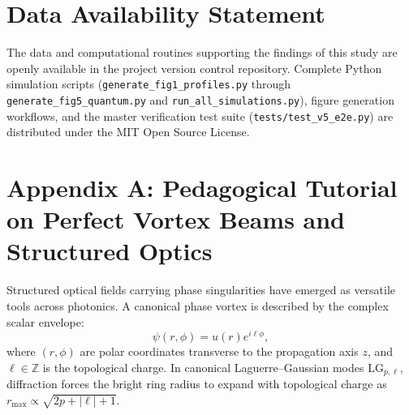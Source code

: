 \documentclass{optica-article}
\begin{document}
\section*{Data Availability Statement}
The data and computational routines supporting the findings of this study are openly available in the project version control repository. Complete Python simulation scripts (\texttt{generate\_fig1\_profiles.py} through \texttt{generate\_fig5\_quantum.py} and \texttt{run\_all\_simulations.py}), figure generation workflows, and the master verification test suite (\texttt{tests/test\_v5\_e2e.py}) are distributed under the MIT Open Source License.


\appendix

\section{Appendix A: Pedagogical Tutorial on Perfect Vortex Beams and Structured Optics}
\label{app:primer}

Structured optical fields carrying phase singularities have emerged as versatile tools across photonics. A canonical phase vortex is described by the complex scalar envelope:
\begin{equation}
\psi(r, \phi) = u(r) e^{i \ell \phi},
\label{eq:app_vortex_ansatz}
\end{equation}
where $(r, \phi)$ are polar coordinates transverse to the propagation axis $z$, and $\ell \in \mathbb{Z}$ is the topological charge. In canonical Laguerre--Gaussian modes $\text{LG}_{p, \ell}$, diffraction forces the bright ring radius to expand with topological charge as $r_{\max} \propto \sqrt{2p + |\ell| + 1}$.
\end{document}
